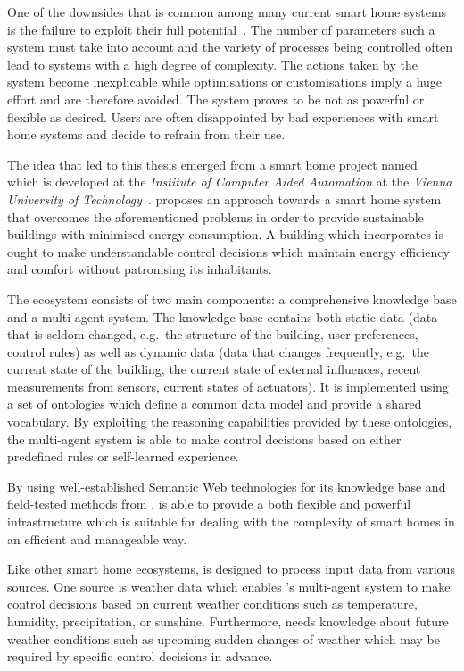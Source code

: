 One of the downsides that is common among many current smart home systems is the failure to exploit their full potential~\cite{HomeAutomationChallengesOpportunities,HomeMaestro,StateOfHomeNetworking}. The number of parameters such a system must take into account and the variety of processes being controlled often lead to systems with a high degree of complexity. The actions taken by the system become inexplicable while optimisations or customisations imply a huge effort and are therefore avoided. The system proves to be not as powerful or flexible as desired. Users are often disappointed by bad experiences with smart home systems and decide to refrain from their use.

The idea that led to this thesis emerged from a smart home project named \thinkhome~\cite{ThinkHomeWeb} which is developed at the \emph{Institute of Computer Aided Automation} at the \emph{Vienna University of Technology}~\cite{CR2011-TH_Journal,CR2010-DEST_ThinkHome}. \thinkhome proposes an approach towards a smart home system that overcomes the aforementioned problems in order to provide sustainable buildings with minimised energy consumption. A building which incorporates \thinkhome is ought to make understandable control decisions which maintain energy efficiency and comfort without patronising its inhabitants.

The \thinkhome ecosystem consists of two main components: a comprehensive knowledge base and a multi-agent system. The knowledge base contains both static data (data that is seldom changed, e.g.\ the structure of the building, user preferences, control rules) as well as dynamic data (data that changes frequently, e.g.\ the current state of the building, the current state of external influences, recent measurements from sensors, current states of actuators). It is implemented using a set of ontologies which define a common data model and provide a shared vocabulary. By exploiting the reasoning capabilities provided by these ontologies, the multi-agent system is able to make control decisions based on either predefined rules or self-learned experience.

By using well-established Semantic Web technologies for its knowledge base and field-tested methods from , \thinkhome is able to provide a both flexible and powerful infrastructure which is suitable for dealing with the complexity of smart homes in an efficient and manageable way.

Like other smart home ecosystems, \thinkhome is designed to process input data from various sources. One source is weather data which enables \thinkhome's multi-agent system to make control decisions based on current weather conditions such as temperature, humidity, precipitation, or sunshine. Furthermore, \thinkhome needs knowledge about future weather conditions such as upcoming sudden changes of weather which may be required by specific control decisions in advance.

